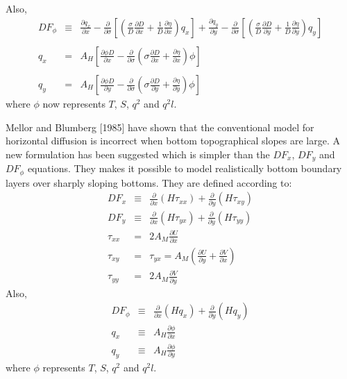 \documentclass[oribibl]{llncs}
\begin{document}
Also,
\begin{eqnarray}
DF_\phi &\equiv& \frac{\partial q_{x}}{\partial x} -\frac{\partial}{\partial \sigma} \left[ \left(  \frac{\sigma}{D} \frac{\partial D}{\partial x} + \frac{1}{D} \frac{\partial \eta}{\partial x} \right) q_{x}  \right] +  \frac{\partial q_{y}}{\partial y} -\frac{\partial}{\partial \sigma} \left[ \left(  \frac{\sigma}{D} \frac{\partial D}{\partial y} + \frac{1}{D} \frac{\partial \eta}{\partial y} \right) q_{y}  \right]   \\ 
\nonumber \\ 
q_x &=&  A_H \left[ \frac{\partial \phi D}{\partial x} - \frac{\partial}{\partial \sigma} \left( \sigma \frac{\partial D}{\partial x} + \frac{\partial \eta}{\partial x}  \right) \phi \right]   \\ 
\nonumber \\ 
q_y &=&  A_H \left[ \frac{\partial \phi D}{\partial y} - \frac{\partial}{\partial \sigma} \left( \sigma \frac{\partial D}{\partial y} + \frac{\partial \eta}{\partial y}  \right) \phi \right] 
\end{eqnarray}
where $\phi$ now represents $T$, $S$, $q^2$ and $q^2 l$.

Mellor and Blumberg [1985] have shown that the conventional model for horizontal diffusion is incorrect when bottom topographical slopes are large. A new formulation has been suggested which is simpler than the $DF_x$, $DF_y$ and $DF_\phi$ equations. They makes it possible to model realistically bottom boundary layers over sharply sloping bottoms. They are defined according to:
\begin{eqnarray}
DF_x &\equiv& \frac{\partial}{\partial x} (H\tau_{xx}) + \frac{\partial}{\partial y} (H\tau_{xy}) \\
DF_y &\equiv& \frac{\partial}{\partial x} (H\tau_{yx}) + \frac{\partial}{\partial y} (H\tau_{yy}) \\
\tau_{xx} &=& 2A_M\frac{\partial U}{\partial x}  \\
\tau_{xy} &=& \tau_{yx} = A_M(\frac{\partial U}{\partial y}+\frac{\partial V}{\partial x})  \\
\tau_{yy} &=& 2A_M \frac{\partial V}{\partial y} 
\end{eqnarray}
Also,
\begin{eqnarray}
DF_\phi &\equiv& \frac{\partial}{\partial x}(Hq_x) + \frac{\partial}{\partial y}(Hq_y) \\
q_x &\equiv& A_H\frac{\partial \phi}{\partial x} \\
q_y &\equiv& A_H\frac{\partial \phi}{\partial y}
\end{eqnarray}
where $\phi$ represents $T$, $S$, $q^2$ and $q^2 l$. 
\end{document}
